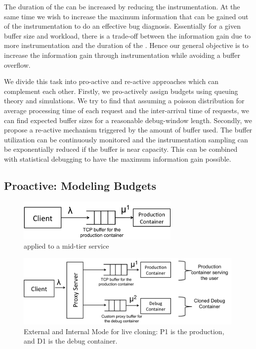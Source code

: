 The duration of the \debugwindow can be increased by reducing the instrumentation.
At the same time we wish to increase the maximum information that can be gained out of the instrumentation to do an effective bug diagnosis.
Essentially for a given buffer size and workload, there is a trade-off between the information gain due to more instrumentation and the duration of the \debugwindow.
Hence our general objective is to increase the information gain through instrumentation while avoiding a buffer overflow.

We divide this task into  pro-active and re-active approaches which can complement each other. Firstly, we pro-actively assign budgets using queuing theory and simulations. We try to find that assuming a poisson distribution for average processing time of each request and the inter-arrival time of requests, we can find expected buffer sizes for a reasonable debug-window length. Secondly, we propose a re-active mechanism triggered by the amount of buffer used. The buffer utilization can be continuously monitored and the instrumentation sampling can be exponentially reduced if the buffer is near capacity. This can be combined with statistical debugging to have the maximum information gain possible. 

\subsection{Proactive: Modeling Budgets}
\label{sec:activeProactiveModeling}


\begin{figure}[t!]

		\centering
		\includegraphics[width=0.7\textwidth]{queue/figs/queue.pdf}
		\caption{\parikshan applied to a mid-tier service}
		\label{fig:queueModel}
\end{figure}
\begin{figure}
		\centering
		\includegraphics[width=0.99\textwidth]{queue/figs/queueCloned.pdf}
		\caption{External and Internal Mode for live cloning: P1 is the production, and D1 is the debug container.}
		\label{fig:queueClonedModel}
\end{figure}
	
